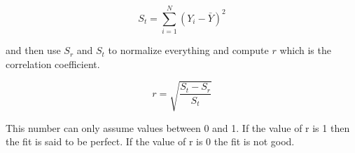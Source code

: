 \begin{enumerate}
\begin{equation}
S_t = \sum\limits_{i=1}^N (Y_i-\bar{Y})^2
\end{equation}

and then use $S_r$ and $S_t$ to normalize everything and compute $r$
which is the correlation coefficient.

\begin{equation}
r = \sqrt{\frac{S_t-S_r}{S_t}}
\end{equation}

This number can only assume values between 0 and 1. If the value of r
is 1 then the fit is said to be perfect. If the value of r is 0 the
fit is not good.

\end{enumerate}
